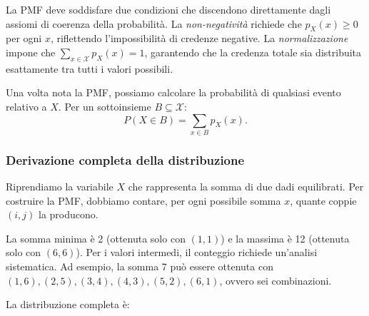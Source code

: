 \documentclass[
  letterpaper,
  DIV=11,
  numbers=noendperiod,
  oneside]{scrreprt}
\theoremstyle{definition}
\theoremstyle{plain}
\theoremstyle{definition}
\theoremstyle{remark}
\begin{document}
La PMF deve soddisfare due condizioni che discendono direttamente dagli
assiomi di coerenza della probabilità. La \emph{non-negatività} richiede
che \(p_X(x) \geq 0\) per ogni \(x\), riflettendo l'impossibilità di
credenze negative. La \emph{normalizzazione} impone che
\(\sum_{x \in \mathcal{X}} p_X(x) = 1\), garantendo che la credenza
totale sia distribuita esattamente tra tutti i valori possibili.

Una volta nota la PMF, possiamo calcolare la probabilità di qualsiasi
evento relativo a \(X\). Per un sottoinsieme
\(B \subseteq \mathcal{X}\): \[
P(X \in B) = \sum_{x \in B} p_X(x).
\]

\begin{tcolorbox}[enhanced jigsaw, arc=.35mm, breakable, colbacktitle=quarto-callout-note-color!10!white, opacityback=0, toprule=.15mm, rightrule=.15mm, colback=white, opacitybacktitle=0.6, leftrule=.75mm, coltitle=black, bottomtitle=1mm, left=2mm, toptitle=1mm, title=\textcolor{quarto-callout-note-color}{\faInfo}\hspace{0.5em}{Esempio: PMF della somma di due dadi}, titlerule=0mm, bottomrule=.15mm, colframe=quarto-callout-note-color-frame]

\subsubsection*{Derivazione completa della
distribuzione}\label{derivazione-completa-della-distribuzione}

Riprendiamo la variabile \(X\) che rappresenta la somma di due dadi
equilibrati. Per costruire la PMF, dobbiamo contare, per ogni possibile
somma \(x\), quante coppie \((i,j)\) la producono.

La somma minima è 2 (ottenuta solo con \((1,1)\)) e la massima è 12
(ottenuta solo con \((6,6)\)). Per i valori intermedi, il conteggio
richiede un'analisi sistematica. Ad esempio, la somma 7 può essere
ottenuta con \((1,6), (2,5), (3,4), (4,3), (5,2), (6,1)\), ovvero sei
combinazioni.

La distribuzione completa è:


\end{tcolorbox}
\end{document}
